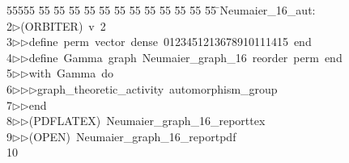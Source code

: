 %
%
\begin{tabbing}
55555 \= 55 \= 55 \= 55 \= 55 \= 55 \= 55 \= 55 \= 55 \= 55 \= 55 \= 55 \= 55 \= \>Neumaier\_16\_aut:\\[0pt]
2\>$\triangleright$\>(ORBITER)\ v\ 2\ \\[0pt]
3\>$\triangleright$\>$\triangleright$\>define\ perm\ vector\ dense\ 0123451213678910111415\ end\ \\[0pt]
4\>$\triangleright$\>$\triangleright$\>define\ Gamma\ graph\ Neumaier\_graph\_16\ reorder\ perm\ end\ \\[0pt]
5\>$\triangleright$\>$\triangleright$\>with\ Gamma\ do\ \\[0pt]
6\>$\triangleright$\>$\triangleright$\>$\triangleright$\>graph\_theoretic\_activity\ automorphism\_group\ \\[0pt]
7\>$\triangleright$\>$\triangleright$\>end\\[0pt]
8\>$\triangleright$\>$\triangleright$\>(PDFLATEX)\ Neumaier\_graph\_16\_reporttex\\[0pt]
9\>$\triangleright$\>$\triangleright$\>(OPEN)\ Neumaier\_graph\_16\_reportpdf\\[0pt]
10\>\end{tabbing}
